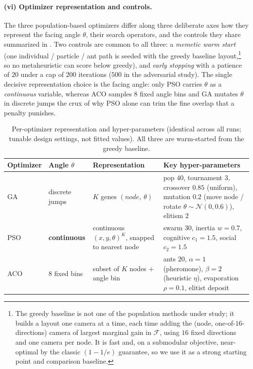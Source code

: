 \documentclass{ai-lab-report}
\begin{document}
\paragraph{(vi) Optimizer representation and controls.} The three population-based optimizers differ along three deliberate axes how they represent the facing angle $\theta$, their search operators, and the controls they share summarized in . Two controls are common to all three: a \emph{memetic warm start}~\citep{neri2012memetic} (one individual / particle / ant path is seeded with the greedy baseline layout,\footnote{The greedy baseline is not one of the population methods under study; it builds a layout one camera at a time, each time adding the (node, one-of-$16$-directions) camera of largest marginal gain in $\mathcal F$, using $16$ fixed directions and one camera per node. It is fast and, on a submodular objective, near-optimal by the classic $(1-1/e)$ guarantee, so we use it as a strong starting point and comparison baseline.} so no metaheuristic can score below greedy), and \emph{early stopping} with a patience of $20$ under a cap of $200$ iterations ($500$ in the adversarial study). The single decisive representation choice is the facing angle: only PSO carries $\theta$ as a \emph{continuous} variable, whereas ACO samples $8$ fixed angle bins and GA mutates $\theta$ in discrete jumps the crux of why PSO alone can trim the fine overlap that a penalty punishes.

\begin{table}[H]
\centering
\small
\begin{tabularx}{\linewidth}{@{}llXX@{}}
\toprule
Optimizer & Angle $\theta$ & Representation & Key hyper-parameters \\
\midrule
GA & discrete jumps & $K$ genes $(node,\ \theta)$ & pop $40$, tournament $3$, crossover $0.85$ (uniform), mutation $0.2$ (move node / rotate $\theta{\sim}\mathcal N(0,0.6)$), elitism $2$ \\
PSO & \textbf{continuous} & continuous $(x,y,\theta)^{K}$, snapped to nearest node & swarm $30$, inertia $w{=}0.7$, cognitive $c_1{=}1.5$, social $c_2{=}1.5$ \\
ACO & $8$ fixed bins & subset of $K$ nodes $+$ angle bin & ants $20$, $\alpha{=}1$ (pheromone), $\beta{=}2$ (heuristic $\eta$), evaporation $\rho{=}0.1$, elitist deposit \\
\bottomrule
\end{tabularx}
\caption{Per-optimizer representation and hyper-parameters (identical across all runs; tunable design settings, not fitted values). All three are warm-started from the greedy baseline.}
\label{tab:a3hyper}
\end{table}
\end{document}
